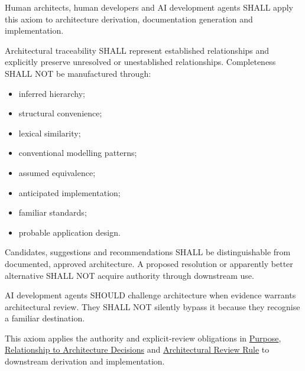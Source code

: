 Human architects, human developers and AI development agents SHALL apply
this axiom to architecture derivation, documentation generation and
implementation.



Architectural traceability SHALL represent established relationships and
explicitly preserve unresolved or unestablished relationships.
Completeness SHALL NOT be manufactured through:



\begin{itemize}


\item inferred hierarchy;

\item structural convenience;

\item lexical similarity;

\item conventional modelling patterns;

\item assumed equivalence;

\item anticipated implementation;

\item familiar standards;

\item probable application design.

\end{itemize}


Candidates, suggestions and recommendations SHALL be distinguishable from
documented, approved architecture. A proposed resolution or apparently
better alternative SHALL NOT acquire authority through downstream use.



AI development agents SHOULD challenge architecture when evidence
warrants architectural review. They SHALL NOT silently bypass it because
they recognise a familiar destination.



This axiom applies the authority and explicit-review obligations in
\href{\detokenize{../../../../governance/architectural-axioms.md#1-purpose}}{Purpose}, \href{\detokenize{../../../../governance/architectural-axioms.md#6-relationship-to-architecture-decisions}}{Relationship to Architecture Decisions}
and \href{\detokenize{../../../../governance/architectural-axioms.md#7-architectural-review-rule}}{Architectural Review Rule} to downstream
derivation and implementation.



